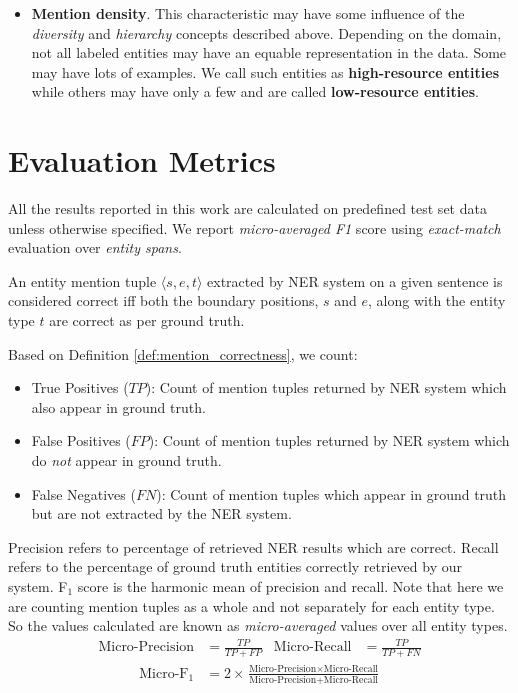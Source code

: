 \begin{itemize}
    \item \textbf{Mention density}. This characteristic may have some influence of the \textit{diversity} and \textit{hierarchy} concepts described above. Depending on the domain, not all labeled entities may have an equable representation in the data. Some may have lots of examples. We call such entities as \textbf{high-resource entities} while others may have only a few and are called \textbf{low-resource entities}.
    
\end{itemize}

\section{Evaluation Metrics}
\label{sec:evaluation_metrics}
All the results reported in this work are calculated on predefined test set data unless otherwise specified. We report \textit{micro-averaged F1} score using \textit{exact-match} evaluation over \textit{entity spans}. 

\begin{definition}
\label{def:mention_correctness}
An entity mention tuple $\langle s, e, t \rangle$ extracted by NER system on a given sentence is considered correct iff both the boundary positions, $s$ and $e$, along with the entity type $t$ are correct as per ground truth.
\end{definition} 

Based on Definition \ref{def:mention_correctness}, we count:

\begin{itemize}
    \item True Positives ($TP$): Count of mention tuples returned by NER system which also appear in ground truth.
    
    \item False Positives ($FP$): Count of mention tuples returned by NER system which do \textit{not} appear in ground truth.
    
    \item False Negatives ($FN$): Count of mention tuples which appear in ground truth but are not extracted by the NER system.
\end{itemize}

Precision refers to percentage of retrieved NER results which are correct. Recall refers to the percentage of ground truth entities correctly retrieved by our system. F$_1$ score is the harmonic mean of precision and recall. Note that here we are counting mention tuples as a whole and not separately for each entity type. So the values calculated are known as \textit{micro-averaged} values over all entity types.
\begin{align*}
    \text{Micro-Precision} &= \frac{TP}{TP + FP} & \text{Micro-Recall} &= \frac{TP}{TP + FN}
\end{align*}
\begin{align*}
    \text{Micro-F}_1 &= 2 \times \frac{\text{Micro-Precision} \times \text{Micro-Recall}}{\text{Micro-Precision} + \text{Micro-Recall}}
\end{align*}

